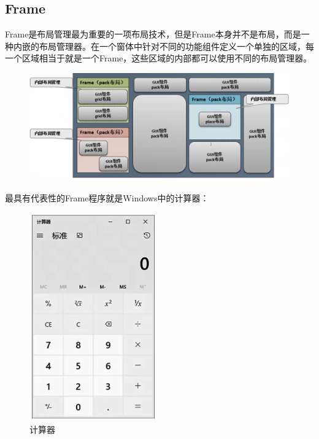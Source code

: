 \vspace{0.5cm}

\subsection{Frame}

Frame是布局管理最为重要的一项布局技术，但是Frame本身并不是布局，而是一种内嵌的布局管理器。在一个窗体中针对不同的功能组件定义一个单独的区域，每一个区域相当于就是一个Frame，这些区域的内部都可以使用不同的布局管理器。

\begin{figure}[H]
	\centering
	\includegraphics[scale=0.6]{img/C13/13-3/5.png}
\end{figure}

最具有代表性的Frame程序就是Windows中的计算器：

\begin{figure}[H]
	\centering
	\includegraphics[]{img/C13/13-3/6.png}
	\caption{计算器}
\end{figure}

\vspace{0.5cm}


